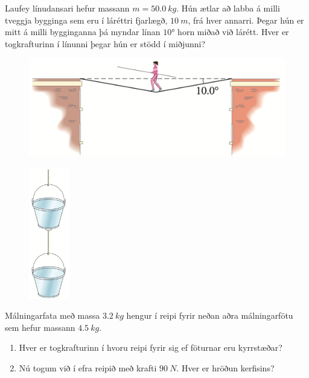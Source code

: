 \begin{enumerate}[label = \textbf{Dæmi \thechapter.\arabic*.}]
\item Laufey línudansari hefur massann $m = \SI{50.0}{kg}$. Hún ætlar að labba á milli tveggja bygginga sem eru í láréttri fjarlægð, $\SI{10}{m}$, frá hver annarri. Þegar hún er mitt á milli bygginganna þá myndar línan $\ang{10}$ horn miðað við lárétt. Hver er togkrafturinn í línunni þegar hún er stödd í miðjunni?

\begin{figure}[H]
    \centering
    \includegraphics[scale = 0.4]{images/lina.png}
\end{figure}

\begin{minipage}{\linewidth}
\begin{figure}
\vspace{-4cm}
\includegraphics[width=0.7in]{images/fotur.png}
\end{figure}

\item Málningarfata með massa $\SI{3.2}{kg}$ hengur í reipi fyrir neðan aðra málningarfötu sem hefur massann $\SI{4.5}{kg}$.
\begin{enumerate}[label = \textbf{(\alph*)}]
    \item Hver er togkrafturinn í hvoru reipi fyrir sig ef föturnar eru kyrrstæðar? 
    \item Nú togum við í efra reipið með krafti $\SI{90}{N}$. Hver er hröðun kerfisins?
\end{enumerate}


\end{minipage}
\end{enumerate}
